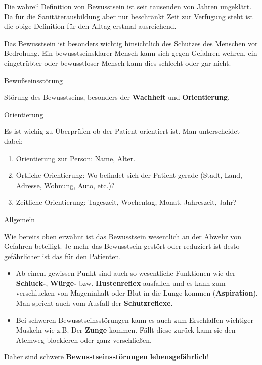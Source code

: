 \documentclass{article}
\newcommand\gEs[1]{\textbf{\textcolor[rgb]{0.0,0.0,0.5019608}{#1}}}
\newcommand\gEs[1]{\textbf{\textcolor[rgb]{0.0,0.0,0.5019608}{#1}}}
\newcommand\gT[1]{\textbf{\textup{\textcolor[rgb]{0.0,0.5019608,0.0}{#1}}}}
\newcommand\gZ[1]{\textcolor[rgb]{0.5019608,0.5019608,0.5019608}{#1}}
\begin{document}
{\mdseries
\gZ{Die {\quotedblbase}wahre{\textquotedblleft}
Definition von Bewusstsein ist seit tausenden von Jahren ungekl\"art.
Da f\"ur die Sanit\"aterausbildung aber nur beschr\"ankt Zeit zur
Verf\"ugung steht ist die obige Definition f\"ur den Alltag erstmal
ausreichend.}}

{\mdseries
Das Bewusstsein ist besonders wichtig hinsichtlich des Schutzes des
Menschen vor Bedrohung. Ein bewusstseinsklarer Mensch kann sich gegen
Gefahren wehren, ein eingetr\"ubter oder bewusstloser Mensch kann dies
schlecht oder gar nicht. }

{\mdseries\color[rgb]{0.0,0.0,0.5019608}
Bewu{\ss}seinsst\"orung}

{\mdseries
St\"orung des Bewusstseins, besonders der
\gEs{Wachheit} und
\gEs{Orientierung}. }

{\mdseries
Orientierung}

{\mdseries
Es ist wichig zu \"Uberpr\"ufen ob der Patient orientiert ist. Man
unterscheidet dabei: }

\begin{enumerate}
\item Orientierung zur Person: Name, Alter. 

\item \"Ortliche Orientierung: Wo befindet sich der Patient gerade
(Stadt, Land, Adresse, Wohnung, Auto, etc.)?

\item Zeitliche Orientierung: Tageszeit, Wochentag, Monat, Jahreszeit,
Jahr? 

\end{enumerate}
{\mdseries\color{black}
Allgemein}

{\mdseries
Wie bereits oben erw\"ahnt ist das Bewusstsein wesentlich an der Abwehr
von Gefahren beteiligt. Je mehr das Bewusstsein gest\"ort oder
reduziert ist desto gef\"ahrlicher ist das f\"ur den Patienten. }

\begin{itemize}
\item Ab einem gewissen Punkt sind auch so wesentliche Funktionen wie
der \gT{Schluck-}, \gT{W\"urge-} bzw.
\gT{Hustenreflex} ausfallen und es kann zum verschlucken
von Mageninhalt oder Blut in die Lunge kommen
(\gEs{Aspiration}). Man spricht auch vom Ausfall der
\gT{Schutzreflexe}. 

\item Bei schweren Bewusstseinsst\"orungen kann es auch zum Erschlaffen
wichtiger Muskeln wie z.B. Der \gEs{Zunge} kommen.
F\"allt diese zur\"uck kann sie den Atemweg blockieren oder ganz
verschlie{\ss}en. 

\end{itemize}
{\mdseries
Daher sind schwere \gEs{Bewusstseinsst\"orungen}
\gEs{lebensgef\"ahrlich}!}
\end{document}
